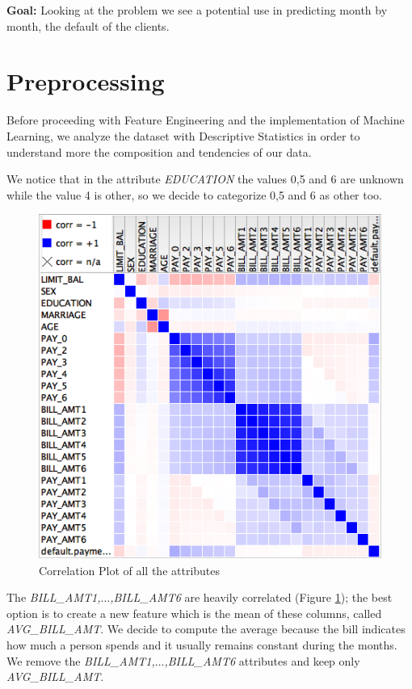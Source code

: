 \documentclass[fleqn,10pt]{SelfArx} %
\begin{document}
	
	\textbf{Goal:}\newline
	Looking at the problem we see a potential use in predicting month by month, the default of the clients.
	
	\section{Preprocessing}
	Before proceeding with Feature Engineering and the  implementation of Machine Learning, we analyze the dataset with Descriptive Statistics in order to understand more the composition and tendencies of our data.
	
	We notice that in the attribute \textit{EDUCATION} the values 0,5 and 6 are unknown while the value 4 is other, so we decide to categorize 0,5 and 6 as other too.
	\begin{figure}[h!]
		\includegraphics[width=\linewidth]{correlation.png}
		\caption{Correlation Plot of all the attributes}
		\label{fig:corr}
	\end{figure}
	
	
	The \textit{BILL\_AMT1,$\hdots$,BILL\_AMT6} are heavily correlated (Figure \ref{fig:corr}); the best option is to create a new feature which is the mean of these columns, called \textit{AVG\_BILL\_AMT}.
	We decide to compute the average because the bill indicates how much a person spends and it usually remains constant during the months. We remove the \textit{BILL\_AMT1,$\hdots$,BILL\_AMT6} attributes and keep only \textit{AVG\_BILL\_AMT}.
	
\end{document}
